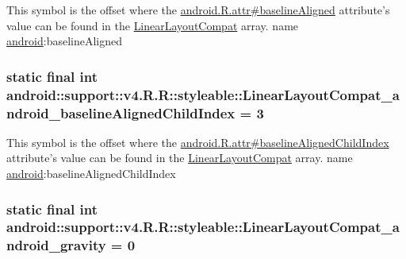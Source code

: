 This symbol is the offset where the \hyperlink{}{android.R.attr\#baselineAligned} attribute's value can be found in the \hyperlink{classandroid_1_1support_1_1v4_1_1_r_1_1styleable_d67ed8d09a6471da7a8c3ba1552dad7e}{LinearLayoutCompat} array.  name \hyperlink{namespaceandroid}{android}:baselineAligned \hypertarget{classandroid_1_1support_1_1v4_1_1_r_1_1styleable_03736db57a910e8d6ce3bc7dc999fcfe}{
\subsubsection[{LinearLayoutCompat\_\-android\_\-baselineAlignedChildIndex}]{\setlength{\rightskip}{0pt plus 5cm}static final int android::support::v4.R.R::styleable::LinearLayoutCompat\_\-android\_\-baselineAlignedChildIndex = 3}}
\label{classandroid_1_1support_1_1v4_1_1_r_1_1styleable_03736db57a910e8d6ce3bc7dc999fcfe}


This symbol is the offset where the \hyperlink{}{android.R.attr\#baselineAlignedChildIndex} attribute's value can be found in the \hyperlink{classandroid_1_1support_1_1v4_1_1_r_1_1styleable_d67ed8d09a6471da7a8c3ba1552dad7e}{LinearLayoutCompat} array.  name \hyperlink{namespaceandroid}{android}:baselineAlignedChildIndex \hypertarget{classandroid_1_1support_1_1v4_1_1_r_1_1styleable_1eb5d592245dd2ab2fe144f2aea87553}{
\subsubsection[{LinearLayoutCompat\_\-android\_\-gravity}]{\setlength{\rightskip}{0pt plus 5cm}static final int android::support::v4.R.R::styleable::LinearLayoutCompat\_\-android\_\-gravity = 0}}
\label{classandroid_1_1support_1_1v4_1_1_r_1_1styleable_1eb5d592245dd2ab2fe144f2aea87553}


